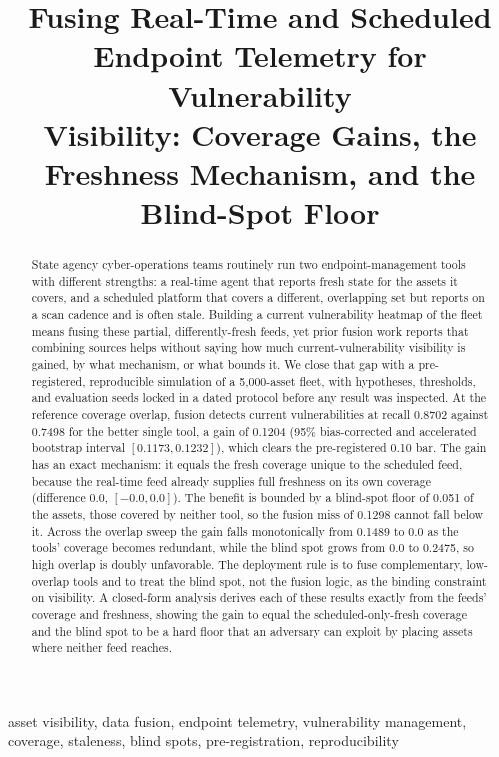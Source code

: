 \documentclass[journal]{IEEEtran}
\title{Fusing Real-Time and Scheduled Endpoint Telemetry for Vulnerability\\
Visibility: Coverage Gains, the Freshness Mechanism, and the Blind-Spot Floor}
\author{%
  \IEEEauthorblockN{Harshavardhan Malla}
  \IEEEauthorblockA{Independent Researcher\\ Email: harshavardhanmalla75@gmail.com}%
}
\begin{document}
\maketitle

\begin{abstract}
State agency cyber-operations teams routinely run two endpoint-management tools with different
strengths: a real-time agent that reports fresh state for the assets it covers, and a scheduled
platform that covers a different, overlapping set but reports on a scan cadence and is often stale.
Building a current vulnerability heatmap of the fleet means fusing these partial, differently-fresh
feeds, yet prior fusion work reports that combining sources helps without saying how much current-vulnerability
visibility is gained, by what mechanism, or what bounds it. We close that gap with a
pre-registered, reproducible simulation of a 5{,}000-asset fleet, with hypotheses, thresholds, and evaluation
seeds locked in a dated protocol before any result was inspected. At the reference coverage overlap, fusion detects
current vulnerabilities at recall 0.8702 against 0.7498 for the better single tool, a gain of
0.1204 (95\% bias-corrected and accelerated bootstrap interval $[0.1173, 0.1232]$), which clears
the pre-registered 0.10 bar. The gain has an exact mechanism: it equals the fresh coverage unique
to the scheduled feed, because the real-time feed already supplies full freshness on its own
coverage (difference 0.0, $[-0.0, 0.0]$). The benefit is bounded by a blind-spot floor of 0.051 of
the assets, those covered by neither tool, so the fusion miss of 0.1298 cannot fall below it. Across the
overlap sweep the gain falls monotonically from 0.1489 to 0.0 as the tools' coverage becomes
redundant, while the blind spot grows from 0.0 to 0.2475, so high overlap is doubly unfavorable.
The deployment rule is to fuse complementary, low-overlap tools and to treat the blind spot, not
the fusion logic, as the binding constraint on visibility. A closed-form analysis derives each of
these results exactly from the feeds' coverage and freshness, showing the gain to equal the
scheduled-only-fresh coverage and the blind spot to be a hard floor that an adversary can exploit by
placing assets where neither feed reaches.
\end{abstract}

\begin{IEEEkeywords}
asset visibility, data fusion, endpoint telemetry, vulnerability management, coverage, staleness,
blind spots, pre-registration, reproducibility
\end{IEEEkeywords}
\end{document}
